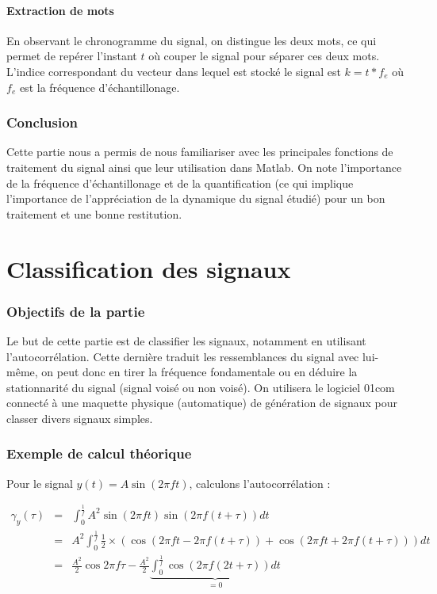 \documentclass[french]{article}
\begin{document}
\subsection{Extraction de mots}

En observant le chronogramme du signal, on distingue les deux mots, ce qui permet de repérer l'instant $t$ où couper le signal pour séparer ces deux mots. L'indice correspondant du vecteur dans lequel est stocké le signal est $k=t*f_e$ où $f_e$ est la fréquence d'échantillonage.

\section*{Conclusion}
Cette partie nous a permis de nous familiariser avec les principales fonctions de traitement du signal ainsi que leur utilisation dans Matlab. On note l'importance de la fréquence d'échantillonage et de la quantification (ce qui implique l'importance de l'appréciation de la dynamique du signal étudié) pour un bon traitement et une bonne restitution. 

\FloatBarrier
\newpage
\clearpage
\part{ Classification des signaux}

\section*{Objectifs de la partie}
Le but de cette partie est de classifier les signaux, notamment en utilisant l'autocorrélation. Cette dernière traduit les ressemblances du signal avec lui-même, on peut donc en tirer la fréquence fondamentale ou en déduire la stationnarité du signal (signal voisé ou non voisé). On utilisera le logiciel 01com connecté à une maquette physique (automatique) de génération de signaux pour classer divers signaux simples.

\section{ Exemple de calcul théorique}

Pour le signal $y(t) = A \sin(2 \pi f t)$, calculons l'autocorrélation :

\begin{eqnarray}
\gamma_y(\tau) &=& \int_0^{\frac{1}{f}} A^2 \sin(2\pi f t) \sin(2 \pi f (t+\tau)) dt \\
&=& A^2 \int^{\frac{1}{f}}_0 \frac{1}{2} \times (\cos(2\pi f t - 2 \pi f (t+\tau)) + \cos(2\pi f t + 2 \pi f (t + \tau))) dt \\
&=& \frac{A^2}{2} \cos 2\pi f \tau - \frac{A^2}{2}\underbrace{\int_0^{\frac{1}{f}} \cos (2 \pi f (2t + \tau)) dt}_{=0}
\end{eqnarray}
\end{document}
